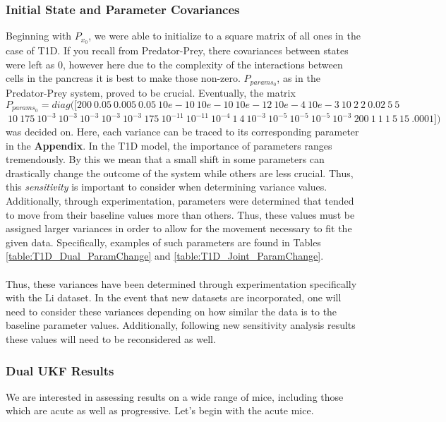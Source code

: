 \documentclass{article}
\begin{document}
\subsubsection{Initial State and Parameter Covariances}\label{section:T1D_Dual_InitialCovariances}
Beginning with $P_{x_0}$, we were able to initialize to a square matrix of all ones in the case of T1D. If you recall from Predator-Prey, there covariances between states were left as 0, however here due to the complexity of the interactions between cells in the pancreas it is best to make those non-zero. $P_{params_0}$, as in the Predator-Prey system, proved to be crucial. Eventually, the matrix
$$ P_{params_0} = diag([200 \ 0.05 \ 0.005 \ 0.05 \ 10e-10 \ 10e-10 \ 10e-12 \ 10e-4 \ 10e-3 \ 10 \ 2 \ 2 \ 0.02 \ 5 \ 5$$ 
$$\ 10 \ 175 \ 10^{-3} \ 10^{-3} \ 10^{-3} \ 10^{-3} \ 10^{-3} \ 175 \ 10^{-11} \ 10^{-11} \ 10^{-4} \ 1 \ 4 \ 10^{-3} \ 10^{-5} \ 10^{-5} \ 10^{-5} \ 10^{-3} \ 200 \ 1 \ 1 \ 1 \ 5 \ 15 \ .0001]) $$ %
was decided on. Here, each variance can be traced to its corresponding parameter in the \textbf{Appendix}. In the T1D model, the importance of parameters ranges tremendously. By this we mean that a small shift in some parameters can drastically change the outcome of the system while others are less crucial. Thus, this \emph{sensitivity} is important to consider when determining variance values. Additionally, through experimentation, parameters were determined that tended to move from their baseline values more than others. Thus, these values must be assigned larger variances in order to allow for the movement necessary to fit the given data. Specifically, examples of such parameters are found in Tables \ref{table:T1D_Dual_ParamChange} and \ref{table:T1D_Joint_ParamChange}.\\
\\
Thus, these variances have been determined through experimentation specifically with the Li dataset. In the event that new datasets are incorporated, one will need to consider these variances depending on how similar the data is to the baseline parameter values. Additionally, following new sensitivity analysis results these values will need to be reconsidered as well. 



\subsubsection{Dual UKF Results} \label{section:T1D_DualUKF_Results}
We are interested in assessing results on a wide range of mice, including those which are acute as well as progressive. Let's begin with the acute mice.
\end{document}
